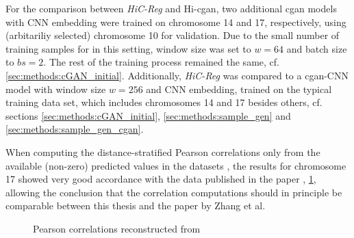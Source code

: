 For the comparison between \emph{HiC-Reg} and Hi-\acrshort{cgan}, two additional \acrshort{cgan} models with CNN embedding were trained on chromosome 14 and 17, respectively,
using (arbitariliy selected) chromosome 10 for validation. 
Due to the small number of training samples for in this setting, window size was set to $w=64$ and batch size to $bs=2$.
The rest of the training process remained the same, cf. \cref{sec:methods:cGAN_initial}.
Additionally, \emph{HiC-Reg} was compared to a \acrshort{cgan}-CNN model with window size $w=256$ and CNN embedding, trained on the typical training data set, 
which includes chromosomes 14 and 17 besides others, cf. sections \ref{sec:methods:cGAN_initial}, \ref{sec:methods:sample_gen} and \ref{sec:methods:sample_gen_cgan}.

When computing the distance-stratified Pearson correlations only from the available (non-zero) predicted values in the datasets \cite{ShiluZhang2019,ShiluZhang2019a},
the results for chromosome 17 showed very good accordance with the data published in the paper \cite[fig.\,10]{Zhang2019}, \cref{fig:methods:zhang_correlations_reconstructed},
allowing the conclusion that the correlation computations should in principle be comparable between this thesis and the paper by Zhang et al.
\begin{figure}[htbp]
 \begin{subfigure}{0.45\textwidth}
 \end{subfigure}\hfill
 \begin{subfigure}{0.45\textwidth}
 \end{subfigure}
\caption{Pearson correlations reconstructed from \cite{Zhang2019}} \label{fig:methods:zhang_correlations_reconstructed}
\end{figure}

